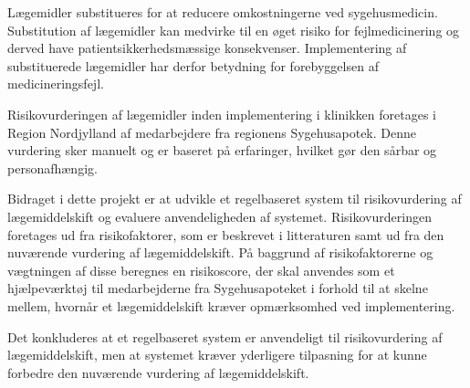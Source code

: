 \vspace{-0.3cm}
Lægemidler substitueres for at reducere omkostningerne ved sygehusmedicin. Substitution af lægemidler kan medvirke til en øget risiko for fejlmedicinering og derved have patientsikkerhedsmæssige konsekvenser. Implementering af substituerede lægemidler har derfor betydning for forebyggelsen af medicineringsfejl. 

Risikovurderingen af lægemidler inden implementering i klinikken foretages i Region Nordjylland af medarbejdere fra regionens Sygehusapotek. Denne vurdering sker manuelt og er baseret på erfaringer, hvilket gør den sårbar og personafhængig. 

Bidraget i dette projekt er at udvikle et regelbaseret system til risikovurdering af lægemiddelskift og evaluere anvendeligheden af systemet. Risikovurderingen foretages ud fra risikofaktorer, som er beskrevet i litteraturen samt ud fra den nuværende vurdering af lægemiddelskift. På baggrund af risikofaktorerne og vægtningen af disse beregnes en risikoscore, der skal anvendes som et hjælpeværktøj til medarbejderne fra Sygehusapoteket i forhold til at skelne mellem, hvornår et lægemiddelskift kræver opmærksomhed ved implementering.

Det konkluderes at et regelbaseret system er anvendeligt til risikovurdering af lægemiddelskift, men at systemet kræver yderligere tilpasning for at kunne forbedre den nuværende vurdering af lægemiddelskift.
\vspace{-0.2cm}